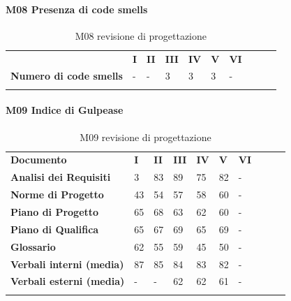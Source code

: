 \paragraph{M08 Presenza di code smells} \mbox{}
\begin{longtable}[H!] {						
		>{}p{50mm}  		
		>{}p{8mm}
		>{}p{8mm}		
		>{}p{8mm}		
		>{}p{8mm}		
		>{}p{8mm}		
		>{}p{8mm}
		>{}p{8mm}
		>{}p{8mm}
		>{}p{8mm}
	}
	\rowcolor{gray!50}
	\textbf{} & \textbf{I} & \textbf{II} & \textbf{III} & \textbf{IV} & \textbf{V} & \textbf{VI} \TBstrut \\ [2mm]
	\textbf{Numero di code smells} & - & - & 3 & 3 & 3 & - \TBstrut \\ [2mm]
	\rowcolor{white}
	\caption{M08 revisione di progettazione}
\end{longtable}
\paragraph{M09 Indice di Gulpease} \mbox{}
\begin{longtable} {						
		>{}p{50mm}  		
		>{}p{8mm}		
		>{}p{8mm}		
		>{}p{8mm}		
		>{}p{8mm}		
		>{}p{8mm}		
		>{}p{8mm}
		>{}p{8mm}
		>{}p{8mm}
		>{}p{8mm}				
	}			
	\rowcolor{gray!50}
	\textbf{Documento} & \textbf{I} & \textbf{II} & \textbf{III} & \textbf{IV} & \textbf{V} & \textbf{VI} \TBstrut \\ [2mm]
	\textbf{Analisi dei Requisiti} & 3 & 83 & 89 & 75 & 82 & - \TBstrut \\ [2mm]
	\textbf{Norme di Progetto} & 43 & 54 & 57 & 58 & 60 & - \TBstrut \\ [2mm]
	\textbf{Piano di Progetto} & 65 & 68 & 63 & 62 & 60 & - \TBstrut \\ [2mm]
	\textbf{Piano di Qualifica} & 65 & 67 & 69 & 65 & 69 & - \TBstrut \\ [2mm]
	\textbf{Glossario} & 62 & 55 & 59 & 45 & 50 & - \TBstrut \\ [2mm]
	\textbf{Verbali interni (media)} & 87 & 85 & 84 & 83 & 82 & - \TBstrut \\ [2mm]
	\textbf{Verbali esterni (media)} & - & - & 62 & 62 & 61 & - \TBstrut \\ [2mm]
	\rowcolor{white}
	\caption{M09 revisione di progettazione}
\end{longtable}
